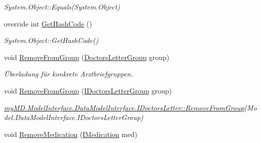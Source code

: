 \begin{CompactItemize}
\begin{CompactList}\small\item\em System.Object::Equals(System.Object) \item\end{CompactList}\item 
\hypertarget{classmy_m_d_1_1_model_1_1_data_model_1_1_doctors_letter_871aff832c00675bb79db4294f382e58}{
override int \hyperlink{classmy_m_d_1_1_model_1_1_data_model_1_1_doctors_letter_871aff832c00675bb79db4294f382e58}{Get\-Hash\-Code} ()}
\label{dc/d86/classmy_m_d_1_1_model_1_1_data_model_1_1_doctors_letter_871aff832c00675bb79db4294f382e58}

\begin{CompactList}\small\item\em System.Object::Get\-Hash\-Code() \item\end{CompactList}\item 
void \hyperlink{classmy_m_d_1_1_model_1_1_data_model_1_1_doctors_letter_7f55c973858b86b4f86b78d8b55ccd4e}{Remove\-From\-Group} (\hyperlink{classmy_m_d_1_1_model_1_1_data_model_1_1_doctors_letter_group}{Doctors\-Letter\-Group} group)
\begin{CompactList}\small\item\em \"{U}berladung f\"{u}r konkrete Arztbriefgruppen. \item\end{CompactList}\item 
\hypertarget{classmy_m_d_1_1_model_1_1_data_model_1_1_doctors_letter_921a6a4ce8826ab9e42d5d5b22a5bc79}{
void \hyperlink{classmy_m_d_1_1_model_1_1_data_model_1_1_doctors_letter_921a6a4ce8826ab9e42d5d5b22a5bc79}{Remove\-From\-Group} (\hyperlink{interfacemy_m_d_1_1_model_interface_1_1_data_model_interface_1_1_i_doctors_letter_group}{IDoctors\-Letter\-Group} group)}
\label{dc/d86/classmy_m_d_1_1_model_1_1_data_model_1_1_doctors_letter_921a6a4ce8826ab9e42d5d5b22a5bc79}

\begin{CompactList}\small\item\em \hyperlink{interfacemy_m_d_1_1_model_interface_1_1_data_model_interface_1_1_i_doctors_letter_921a6a4ce8826ab9e42d5d5b22a5bc79}{my\-MD.Model\-Interface.Data\-Model\-Interface.IDoctors\-Letter::Remove\-From\-Group}(Model.Data\-Model\-Interface.IDoctors\-Letter\-Group) \item\end{CompactList}\item 
\hypertarget{classmy_m_d_1_1_model_1_1_data_model_1_1_doctors_letter_21bff2bea1b5f08bc7e79dd65b9ccf16}{
void \hyperlink{classmy_m_d_1_1_model_1_1_data_model_1_1_doctors_letter_21bff2bea1b5f08bc7e79dd65b9ccf16}{Remove\-Medication} (\hyperlink{interfacemy_m_d_1_1_model_interface_1_1_data_model_interface_1_1_i_medication}{IMedication} med)}
\label{dc/d86/classmy_m_d_1_1_model_1_1_data_model_1_1_doctors_letter_21bff2bea1b5f08bc7e79dd65b9ccf16}


\end{CompactItemize}

